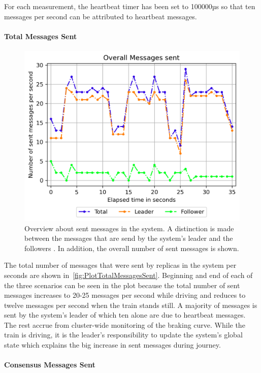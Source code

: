 For each measurement, the heartbeat timer has been set to 100000µs so that ten messages per second can be attributed to heartbeat messages.

\paragraph{Total Messages Sent}

\begin{figure}[!hb]
	\centering
	\includegraphics[width=0.75\linewidth]{images/plots/TotalMessagesSent}
	\caption{Overview about sent messages in the system. A distinction is made between the messages that are send by the system's leader and the followers . In addition, the overall number of sent messages is shown.}
	\label{fig:PlotTotalMessagesSent}
\end{figure}

The total number of messages that were sent by replicas in the system per seconds are shown in~\autoref{fig:PlotTotalMessagesSent}.
Beginning and end of each of the three scenarios can be seen in the plot because the total number of sent messages increases to 20-25 messages per second while driving and reduces to twelve messages per second when the train stands still.
A majority of messages is sent by the system's leader of which ten alone are due to heartbeat messages.
The rest accrue from cluster-wide monitoring of the braking curve.
While the train is driving, it is the leader's responsibility to update the system's global state which explains the big increase in sent messages during journey.

\paragraph{Consensus Messages Sent}

